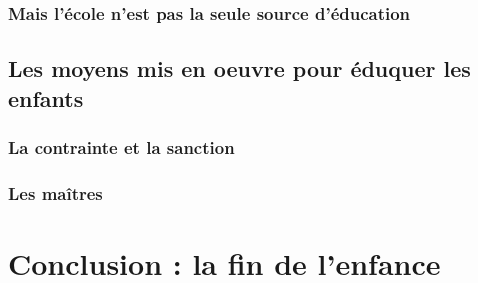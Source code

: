 \documentclass[a4paper, 11pt, hidelinks]{article}
\begin{document}
\subsubsection{Mais l'école n'est pas la seule source d'éducation}




\subsection{Les moyens mis en oeuvre pour éduquer les enfants}

\subsubsection{La contrainte et la sanction}




\subsubsection{Les maîtres}




\section{Conclusion : la fin de l'enfance}
\end{document}
